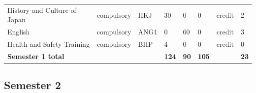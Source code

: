 \documentclass[12pt,a4paper]{article}
\begin{document}
{\begin{longtable}{m{5.0cm}m{1.9cm}m{0.75cm}m{0.85cm}m{0.85cm}m{0.85cm}m{1.45cm}m{0.9cm}}
\rowcolor{tableRowLight} History and Culture of Japan & {\scriptsize compulsory} & HKJ & 30 & 0 & 0 & {\scriptsize credit} & 2 \\
\rowcolor{tableRowAlt} English & {\scriptsize compulsory} & ANG1 & 0 & 60 & 0 & {\scriptsize credit} & 3 \\
\rowcolor{tableRowLight} Health and Safety Training & {\scriptsize compulsory} & BHP & 4 & 0 & 0 & {\scriptsize credit} & 0 \\
\midrule[\heavyrulewidth]
\rowcolor{tableSummary} \textbf{Semester 1 total} & & & \textbf{124} & \textbf{90} & \textbf{105} & & \textbf{23} \\
\bottomrule
\end{longtable}}

\subsection*{Semester 2}
\end{document}
